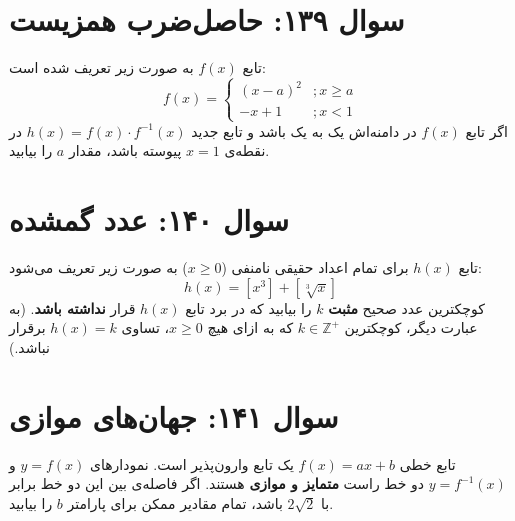 \documentclass[12pt]{article}
\begin{document}
\section*{سوال ۱۳۹: حاصل‌ضرب همزیست}
تابع \(f(x)\) به صورت زیر تعریف شده است:
\begin{displaymath}
	f(x) = 
	\begin{cases}
		(x-a)^2 & ; x \ge a \\
		-x+1 & ; x < 1
	\end{cases}
\end{displaymath}
اگر تابع \(f(x)\) در دامنه‌اش یک به یک باشد و تابع جدید \(h(x) = f(x) \cdot f^{-1}(x)\) در نقطه‌ی \(x=1\) پیوسته باشد، مقدار \(a\) را بیابید.

\vspace{1cm}
\hrulefill
\vspace{1cm}

\section*{سوال ۱۴۰: عدد گمشده}
تابع \(h(x)\) برای تمام اعداد حقیقی نامنفی (\(x \ge 0\)) به صورت زیر تعریف می‌شود:
\begin{displaymath}
	h(x) = [x^3] + [\sqrt[3]{x}]
\end{displaymath}
کوچکترین عدد صحیح \textbf{مثبت} \(k\) را بیابید که در برد تابع \(h(x)\) قرار \textbf{نداشته باشد}.
(به عبارت دیگر، کوچکترین \( k \in \mathbb{Z}^+ \) که به ازای هیچ \(x \ge 0\)، تساوی \(h(x)=k\) برقرار نباشد.)

\vspace{1cm}
\hrulefill
\vspace{1cm}

\section*{سوال ۱۴۱: جهان‌های موازی}
تابع خطی \(f(x) = ax+b\) یک تابع وارون‌پذیر است. نمودارهای \(y=f(x)\) و \(y=f^{-1}(x)\) دو خط راست \textbf{متمایز و موازی} هستند. اگر فاصله‌ی بین این دو خط برابر با \(2\sqrt{2}\) باشد، تمام مقادیر ممکن برای پارامتر \(b\) را بیابید.

\vspace{1cm}
\hrulefill
\vspace{1cm}
\end{document}
